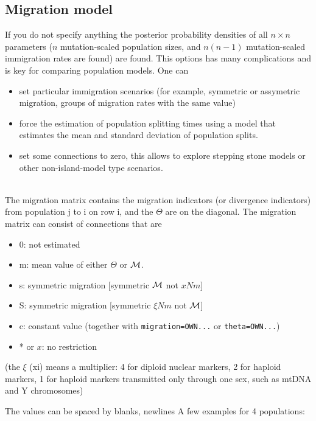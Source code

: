 \subsection{Migration model}
If you do not specify anything the posterior probability densities of all $n\times n$ parameters ($n$ mutation-scaled population sizes, and $n(n-1)$ mutation-scaled immigration rates are found) are found.
This options has many complications and is key for comparing population models. One can
\begin{itemize}
\item set particular immigration scenarios (for example, symmetric or assymetric migration, groups of migration rates with the same value)
\item force the estimation of population splitting times using a model that estimates the mean and standard deviation of population splits.
\item set some connections to zero, this allows to explore stepping stone models or other non-island-model type scenarios.
\end{itemize}

{}\\
The migration matrix contains the migration indicators (or divergence indicators) from population
j to i on row i, and the $\Theta$ are on the diagonal.
The migration matrix can consist of connections that are
\begin{itemize}
\item 0: not estimated
\item m: mean value of either $\Theta$ or $\mathcal{M}$.
\item s: symmetric migration [symmetric $\mathcal{M}$ not $xNm$]
\item S: symmetric migration [symmetric $\xi Nm$ not $\mathcal{M}$]
\item c: constant value (together with  {\tt migration=OWN...} 
or {\tt theta=OWN...})
\item * or $x$: no restriction
\end{itemize}
(the $\xi$ (xi) means a multiplier: 4 for diploid nuclear markers, 2 for haploid markers, 1 for haploid markers transmitted only through one sex, such as mtDNA and Y chromosomes)

The values can be spaced by blanks, newlines
A few examples for 4 populations:

